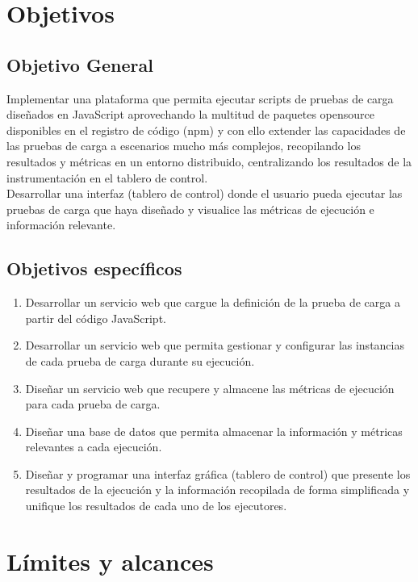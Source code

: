 \documentclass[10pt]{article}
\begin{document}

\section{Objetivos}
\subsection{Objetivo General}
\justify
Implementar una plataforma que permita ejecutar scripts de pruebas de carga diseñados en JavaScript aprovechando la multitud de paquetes opensource disponibles en el registro de código (npm) y con ello extender las capacidades de las pruebas de carga a escenarios mucho más complejos, recopilando los resultados y métricas en un entorno distribuido, centralizando los resultados de la instrumentación en el tablero de control.
\\Desarrollar una interfaz (tablero de control) donde el usuario pueda ejecutar las pruebas de carga que haya diseñado y visualice las métricas de ejecución e información relevante.

\subsection{Objetivos específicos}

\begin{enumerate}
    \item Desarrollar un servicio web que cargue la definición de la prueba de carga a
          partir del código JavaScript.
    \item Desarrollar un servicio web que permita gestionar y configurar las instancias
          de cada prueba de carga durante su ejecución.
    \item Diseñar un servicio web que recupere y almacene las métricas de ejecución para
          cada prueba de carga.
    \item Diseñar una base de datos que permita almacenar la información y métricas
          relevantes a cada ejecución.
    \item Diseñar y programar una interfaz gráfica (tablero de control) que presente los
          resultados de la ejecución y la información recopilada de forma simplificada y
          unifique los resultados de cada uno de los ejecutores.
\end{enumerate}

\section{Límites y alcances}
\end{document}
